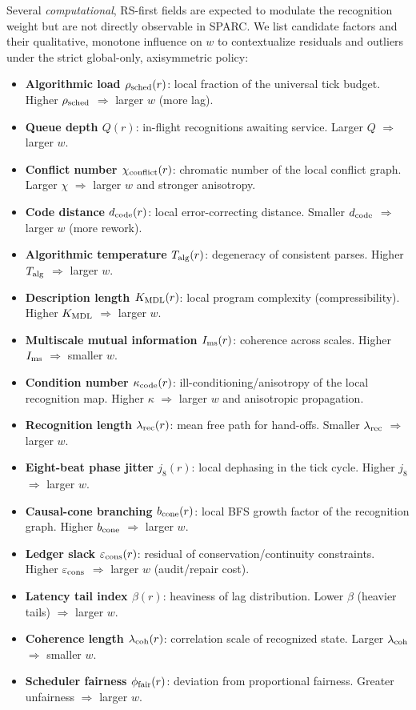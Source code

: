 \documentclass[12pt,a4paper]{article}
\begin{document}
\noindent Several \emph{computational}, RS-first fields are expected to modulate the recognition weight but are not directly observable in SPARC. We list candidate factors and their qualitative, monotone influence on $w$ to contextualize residuals and outliers under the strict global-only, axisymmetric policy:
\begin{itemize}
  \item \textbf{Algorithmic load $\rho_{\rm sched}(r)$}: local fraction of the universal tick budget. Higher $\rho_{\rm sched}$ $\Rightarrow$ larger $w$ (more lag).
  \item \textbf{Queue depth $Q(r)$}: in-flight recognitions awaiting service. Larger $Q$ $\Rightarrow$ larger $w$.
  \item \textbf{Conflict number $\chi_{\rm conflict}(r)$}: chromatic number of the local conflict graph. Larger $\chi$ $\Rightarrow$ larger $w$ and stronger anisotropy.
  \item \textbf{Code distance $d_{\rm code}(r)$}: local error-correcting distance. Smaller $d_{\rm code}$ $\Rightarrow$ larger $w$ (more rework).
  \item \textbf{Algorithmic temperature $T_{\rm alg}(r)$}: degeneracy of consistent parses. Higher $T_{\rm alg}$ $\Rightarrow$ larger $w$.
  \item \textbf{Description length $K_{\rm MDL}(r)$}: local program complexity (compressibility). Higher $K_{\rm MDL}$ $\Rightarrow$ larger $w$.
  \item \textbf{Multiscale mutual information $I_{\rm ms}(r)$}: coherence across scales. Higher $I_{\rm ms}$ $\Rightarrow$ smaller $w$.
  \item \textbf{Condition number $\kappa_{\rm code}(r)$}: ill-conditioning/anisotropy of the local recognition map. Higher $\kappa$ $\Rightarrow$ larger $w$ and anisotropic propagation.
  \item \textbf{Recognition length $\lambda_{\rm rec}(r)$}: mean free path for hand-offs. Smaller $\lambda_{\rm rec}$ $\Rightarrow$ larger $w$.
  \item \textbf{Eight-beat phase jitter $j_8(r)$}: local dephasing in the tick cycle. Higher $j_8$ $\Rightarrow$ larger $w$.
  \item \textbf{Causal-cone branching $b_{\rm cone}(r)$}: local BFS growth factor of the recognition graph. Higher $b_{\rm cone}$ $\Rightarrow$ larger $w$.
  \item \textbf{Ledger slack $\varepsilon_{\rm cons}(r)$}: residual of conservation/continuity constraints. Higher $\varepsilon_{\rm cons}$ $\Rightarrow$ larger $w$ (audit/repair cost).
  \item \textbf{Latency tail index $\beta(r)$}: heaviness of lag distribution. Lower $\beta$ (heavier tails) $\Rightarrow$ larger $w$.
  \item \textbf{Coherence length $\lambda_{\rm coh}(r)$}: correlation scale of recognized state. Larger $\lambda_{\rm coh}$ $\Rightarrow$ smaller $w$.
  \item \textbf{Scheduler fairness $\phi_{\rm fair}(r)$}: deviation from proportional fairness. Greater unfairness $\Rightarrow$ larger $w$.
\end{itemize}
\end{document}
